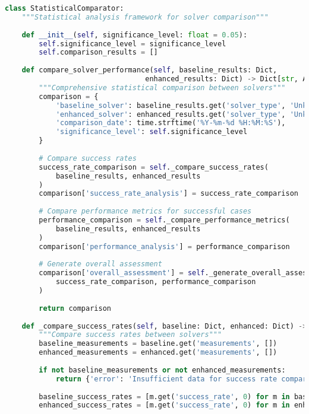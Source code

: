 \begin{lstlisting}[language=Python, caption=Statistical Analysis and Comparison Framework]
class StatisticalComparator:
    """Statistical analysis framework for solver comparison"""
    
    def __init__(self, significance_level: float = 0.05):
        self.significance_level = significance_level
        self.comparison_results = []
    
    def compare_solver_performance(self, baseline_results: Dict, 
                                 enhanced_results: Dict) -> Dict[str, Any]:
        """Comprehensive statistical comparison between solvers"""
        comparison = {
            'baseline_solver': baseline_results.get('solver_type', 'Unknown'),
            'enhanced_solver': enhanced_results.get('solver_type', 'Unknown'),
            'comparison_date': time.strftime('%Y-%m-%d %H:%M:%S'),
            'significance_level': self.significance_level
        }
        
        # Compare success rates
        success_rate_comparison = self._compare_success_rates(
            baseline_results, enhanced_results
        )
        comparison['success_rate_analysis'] = success_rate_comparison
        
        # Compare performance metrics for successful cases
        performance_comparison = self._compare_performance_metrics(
            baseline_results, enhanced_results
        )
        comparison['performance_analysis'] = performance_comparison
        
        # Generate overall assessment
        comparison['overall_assessment'] = self._generate_overall_assessment(
            success_rate_comparison, performance_comparison
        )
        
        return comparison
    
    def _compare_success_rates(self, baseline: Dict, enhanced: Dict) -> Dict:
        """Compare success rates between solvers"""
        baseline_measurements = baseline.get('measurements', [])
        enhanced_measurements = enhanced.get('measurements', [])
        
        if not baseline_measurements or not enhanced_measurements:
            return {'error': 'Insufficient data for success rate comparison'}
        
        baseline_success_rates = [m.get('success_rate', 0) for m in baseline_measurements]
        enhanced_success_rates = [m.get('success_rate', 0) for m in enhanced_measurements]
        

\end{lstlisting}
